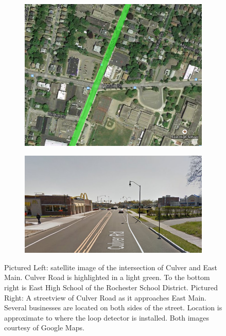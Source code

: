 \documentclass{report}
\begin{document}
\begin{figure}[H]
        \centering
        \begin{subfigure}[b]{0.45\textwidth}
                \includegraphics[width=\textwidth]{satellite_H.png}
        \end{subfigure}
        \begin{subfigure}[b]{0.45\textwidth}
                \includegraphics[width=\textwidth]{streetview.png}
        \end{subfigure}
        \caption{Pictured Left: satellite image of the intersection of Culver and East Main. Culver Road is highlighted in a light green. To the bottom right is East High School of the Rochester School District. Pictured Right: A streetview of Culver Road as it approaches East Main. Several businesses are located on both sides of the street. Location is approximate to where the loop detector is installed. Both images courtesy of Google Maps.}
        \label{fig:intersection}
\end{figure}
\end{document}
